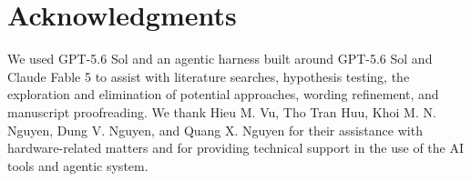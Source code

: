 \documentclass[11pt,reqno]{amsart}
\numberwithin{equation}{section}
\theoremstyle{plain}
\theoremstyle{definition}
\theoremstyle{remark}
\begin{document}
\renewcommand{\sectionname}{}
\section*{Acknowledgments}
We used GPT-5.6 Sol and an agentic harness built around GPT-5.6 Sol and Claude Fable 5 to assist with literature searches, hypothesis testing, the exploration and elimination of potential approaches, wording refinement, and manuscript proofreading. We thank Hieu M. Vu, Tho Tran Huu, Khoi M. N. Nguyen, Dung V. Nguyen, and Quang X. Nguyen for their assistance with hardware-related matters and for providing technical support in the use of the AI tools and agentic system. %


\end{document}
